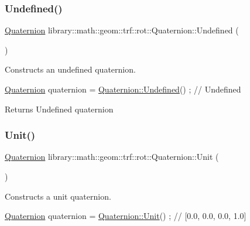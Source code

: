 \subsubsection{\texorpdfstring{Undefined()}{Undefined()}}
{\footnotesize\ttfamily \hyperlink{classlibrary_1_1math_1_1geom_1_1trf_1_1rot_1_1_quaternion}{Quaternion} library\+::math\+::geom\+::trf\+::rot\+::\+Quaternion\+::\+Undefined (\begin{DoxyParamCaption}{ }\end{DoxyParamCaption})\hspace{0.3cm}{\ttfamily [static]}}



Constructs an undefined quaternion. 


\begin{DoxyCode}
\hyperlink{classlibrary_1_1math_1_1geom_1_1trf_1_1rot_1_1_quaternion_aa7f459a08f5af38b9f7676a6bf36a21c}{Quaternion} quaternion = \hyperlink{classlibrary_1_1math_1_1geom_1_1trf_1_1rot_1_1_quaternion_acfe6f33b1691ad47c15fcb6269ff440c}{Quaternion::Undefined}() ; \textcolor{comment}{// Undefined}
\end{DoxyCode}


\begin{DoxyReturn}{Returns}
Undefined quaternion 
\end{DoxyReturn}
\mbox{\label{classlibrary_1_1math_1_1geom_1_1trf_1_1rot_1_1_quaternion_aa7cb20c2918d117edb85073bffb3a381}} 
\subsubsection{\texorpdfstring{Unit()}{Unit()}}
{\footnotesize\ttfamily \hyperlink{classlibrary_1_1math_1_1geom_1_1trf_1_1rot_1_1_quaternion}{Quaternion} library\+::math\+::geom\+::trf\+::rot\+::\+Quaternion\+::\+Unit (\begin{DoxyParamCaption}{ }\end{DoxyParamCaption})\hspace{0.3cm}{\ttfamily [static]}}



Constructs a unit quaternion. 


\begin{DoxyCode}
\hyperlink{classlibrary_1_1math_1_1geom_1_1trf_1_1rot_1_1_quaternion_aa7f459a08f5af38b9f7676a6bf36a21c}{Quaternion} quaternion = \hyperlink{classlibrary_1_1math_1_1geom_1_1trf_1_1rot_1_1_quaternion_aa7cb20c2918d117edb85073bffb3a381}{Quaternion::Unit}() ; \textcolor{comment}{// [0.0, 0.0, 0.0, 1.0]}
\end{DoxyCode}


